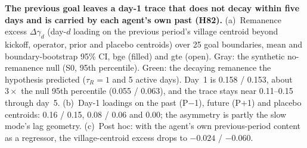 \caption{\textbf{The previous goal leaves a day-1 trace that does not decay within five days and is carried by each agent's own past (H82).}
(a)~Remanence excess $\Delta\gamma_d$ (day-$d$ loading on the previous period's village centroid beyond kickoff, operator, prior and placebo centroids) over 25 goal boundaries, mean and boundary-bootstrap 95\% CI, bge (filled) and gte (open). Gray: the synthetic no-remanence null (S0, 95th percentile). Green: the decaying remanence the hypothesis predicted ($\tau_R=1$ and 5 active days). Day~1 is 0.158 / 0.153, about $3\times$ the null 95th percentile (0.055 / 0.063), and the trace stays near 0.11--0.15 through day~5.
(b)~Day-1 loadings on the past (P$-$1), future (P$+$1) and placebo centroids: 0.16 / 0.15, 0.08 / 0.06 and 0.00; the asymmetry is partly the slow mode's lag geometry.
(c)~Post hoc: with the agent's own previous-period content as a regressor, the village-centroid excess drops to $-0.024$ / $-0.060$.}
\label{fig:H82}
